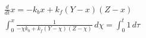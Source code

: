 \begin{align}
  \frac{d}{d t} x = - k_{b} x + k_{f} \left(Y - x\right) \left(Z - x\right) \\
  \int_{0}^{x} \frac{1}{- \chi k_{b} + k_{f} \left(Y - \chi\right) \left(Z - \chi\right)}\, d\chi = \int_{0}^{t} 1\, d\tau
\end{align}